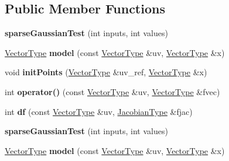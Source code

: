 \subsection*{Public Member Functions}
\begin{DoxyCompactItemize}
\item 
\mbox{\label{structsparse_gaussian_test_aff25399a745be93e1b6e4b6a8c37c060}} 
{\bfseries sparse\+Gaussian\+Test} (int inputs, int values)
\item 
\mbox{\label{structsparse_gaussian_test_abadde41ce86ef77310138cd77c9f5821}} 
\hyperlink{group___core___module}{Vector\+Type} {\bfseries model} (const \hyperlink{group___core___module}{Vector\+Type} \&uv, \hyperlink{group___core___module}{Vector\+Type} \&x)
\item 
\mbox{\label{structsparse_gaussian_test_a964e03cd4e6c6bb25894d0a0f971e9c5}} 
void {\bfseries init\+Points} (\hyperlink{group___core___module}{Vector\+Type} \&uv\+\_\+ref, \hyperlink{group___core___module}{Vector\+Type} \&x)
\item 
\mbox{\label{structsparse_gaussian_test_a20fdf53322777c8d091a41ec126cbf34}} 
int {\bfseries operator()} (const \hyperlink{group___core___module}{Vector\+Type} \&uv, \hyperlink{group___core___module}{Vector\+Type} \&fvec)
\item 
\mbox{\label{structsparse_gaussian_test_a613e13b4e27120473ba6bc74d224aef8}} 
int {\bfseries df} (const \hyperlink{group___core___module}{Vector\+Type} \&uv, \hyperlink{group___sparse_core___module_class_eigen_1_1_sparse_matrix}{Jacobian\+Type} \&fjac)
\item 
\mbox{\label{structsparse_gaussian_test_aff25399a745be93e1b6e4b6a8c37c060}} 
{\bfseries sparse\+Gaussian\+Test} (int inputs, int values)
\item 
\mbox{\label{structsparse_gaussian_test_abadde41ce86ef77310138cd77c9f5821}} 
\hyperlink{group___core___module}{Vector\+Type} {\bfseries model} (const \hyperlink{group___core___module}{Vector\+Type} \&uv, \hyperlink{group___core___module}{Vector\+Type} \&x)
\item 

\end{DoxyCompactItemize}
